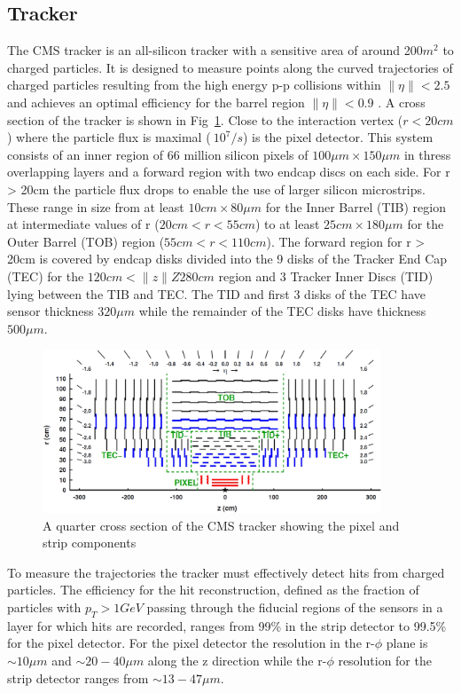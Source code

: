 \subsection{Tracker}
The CMS tracker is an all-silicon tracker with a sensitive area of around 200$m^2$ to charged particles. It is designed to measure points along the
curved trajectories of charged particles resulting from the high energy p-p collisions within $\|\eta\| < 2.5$ and achieves
an optimal efficiency for the barrel region $\|\eta\| < 0.9$ \cite{tracker_performance,tracker_tdr}. A cross section of the tracker is shown in Fig~\ref{TRACKER_SLICE}.
Close to the interaction vertex ($r < 20cm$) where the particle flux is maximal ($~10^7/s$) is the pixel detector. This system consists of an inner region of 66 million silicon 
pixels of $100\mu m \times 150\mu m$ in thress overlapping layers and a forward region with two endcap discs on each side.
For r > 20cm the particle flux drops to enable the use of larger silicon microstrips. These range in size from at least $10cm \times 80\mu m$ for the Inner Barrel (TIB) region 
at intermediate values of r ($20cm < r < 55cm$) to at least $25cm \times 180\mu m$ for the Outer Barrel (TOB) region ($55cm < r < 110cm$). The forward region
for r > 20cm is covered by endcap disks divided into the 9 disks of the Tracker End Cap (TEC) for the $120cm < \|z\| Z 280 cm$ region and 
3 Tracker Inner Discs (TID) lying between the TIB and TEC. The TID and first 3 disks of the TEC have sensor thickness $320\mu m$ while the remainder of the TEC disks
have thickness $500\mu m$\cite{tracker_tdr}.

\begin{figure}
\centering
    \includegraphics[width=0.9\textwidth]{./Figures/detector/CMS2Dtracker}
  \caption{A quarter cross section of the CMS tracker showing the pixel and strip components \cite{tracker_fig}}
  \label{TRACKER_SLICE}
\end{figure}

To measure the trajectories the tracker must effectively detect hits from charged particles. The efficiency for the 
hit reconstruction, defined as the fraction of particles with $p_T > 1 GeV$ passing through the fiducial regions of the sensors
in a layer for which hits are recorded, ranges from 99\% in the strip detector to 99.5\% for the pixel detector.
For the pixel detector the resolution in the r-$\phi$ plane is $\sim10\mu m$ and $\sim20-40\mu m$ along
the z direction while the r-$\phi$ resolution for the strip detector ranges from $\sim13-47\mu m$.

